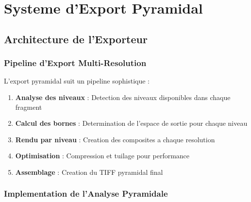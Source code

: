 \documentclass[12pt,a4paper]{article}
\begin{document}
\section{Systeme d'Export Pyramidal}

\subsection{Architecture de l'Exporteur}

\subsubsection{Pipeline d'Export Multi-Resolution}

L'export pyramidal suit un pipeline sophistique :

\begin{enumerate}
\item \textbf{Analyse des niveaux} : Detection des niveaux disponibles dans chaque fragment
\item \textbf{Calcul des bornes} : Determination de l'espace de sortie pour chaque niveau
\item \textbf{Rendu par niveau} : Creation des composites a chaque resolution
\item \textbf{Optimisation} : Compression et tuilage pour performance
\item \textbf{Assemblage} : Creation du TIFF pyramidal final
\end{enumerate}

\subsubsection{Implementation de l'Analyse Pyramidale}
\end{document}
